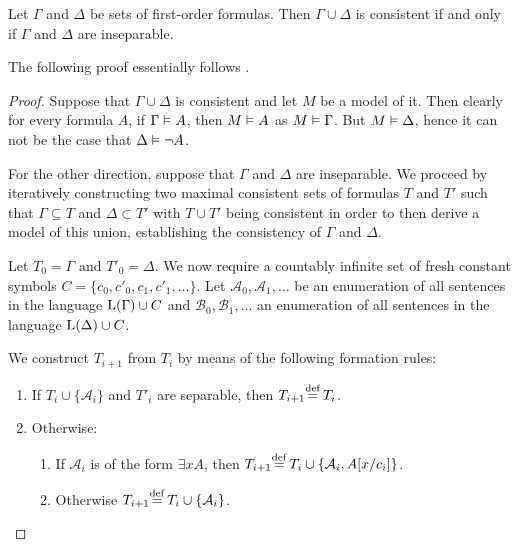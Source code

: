 \begin{thm}
	\label{thm:robinson}
	Let $\Gamma$ and $\Delta$ be sets of first-order formulas.
	Then $\Gamma \cup \Delta$ is consistent if and only if $\Gamma$ and $\Delta$ are inseparable.
\end{thm}
The following proof essentially follows \cite{chang1990model}.
\begin{proof}
	Suppose that $\Gamma\cup\Delta$ is consistent and let $M$ be a model of it.
	Then clearly for every formula $A$, if $\Gamma \vDash A$, then $M \vDash A$ as $M \vDash \Gamma$.
	But $M \vDash \Delta$, hence it can not be the case that $\Delta \vDash \lnot A$.

	For the other direction, suppose that $\Gamma$ and $\Delta$ are inseparable.
	We proceed by iteratively constructing two maximal consistent sets of formulas $T$ and $T'$ such that $\Gamma \subseteq T$ and $\Delta \subset T'$ with $T \cup T'$ being consistent in order to then derive a model of this union, establishing the consistency of $\Gamma$ and $\Delta$.

	Let $T_0 = \Gamma$ and $T'_0 = \Delta$. 
	We now require a countably infinite set of fresh constant symbols $C = \{c_0, c'_0, c_1, c'_1, \dots\}$.
	Let $\mathcal{A}_0, \mathcal{A}_1, \dots$ be an enumeration of all sentences in the language $\operatorname{L}(\Gamma) \cup C$
	and $\mathcal{B}_0, \mathcal{B}_1, \dots$ an enumeration of all sentences in the language $\operatorname{L}(\Delta) \cup C$.

	We construct
	$T_{i+1}$ 
	from
	$T_{i}$
	by means of the following formation rules:
	\begin{enumerate}[(1)]
		\item
			\label{theory_construction_1}
			If $T_{i} \cup \{\mathcal{A}_i\}$ and $T'_{i}$ are separable, then $T_{i+1} \defeq{}\, T_i$.
		\item Otherwise:
			\label{theory_construction_2}
			\begin{enumerate}[(2a)]
			\label{theory_construction_2a}
				\item If $\mathcal{A}_i$ is of the form $\exists x A$, then $T_{i+1} \defeq{}\, T_i \cup \{ \mathcal{A}_i, A\subst{x/c_i} \}$.
			\label{theory_construction_2b}
				\item Otherwise $T_{i+1} \defeq{}\, T_i \cup \{ \mathcal{A}_i \}$.
			\end{enumerate}
	\end{enumerate}


\end{proof}
